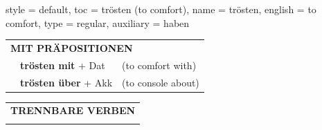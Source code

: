 \begin{verbentry}{
  style = {default},
  toc = {trösten (to comfort)},
  name = {trösten},
  english = {to comfort},
  type = {regular},
  auxiliary = {haben}
}
\vspace{10pt}

\begin{tabular}{lll}
\multicolumn{3}{l}{\textbf{MIT PRÄPOSITIONEN}}\\
& \textbf{trösten mit} + Dat & (to comfort with)\\
& \textbf{trösten über} + Akk & (to console about)\\
\end{tabular}
\hfill
\begin{tabular}{lll}
\multicolumn{3}{l}{\textbf{TRENNBARE VERBEN}}\\
\vspace{20pt}
\end{tabular}
\vspace{-5pt}
\end{verbentry}

